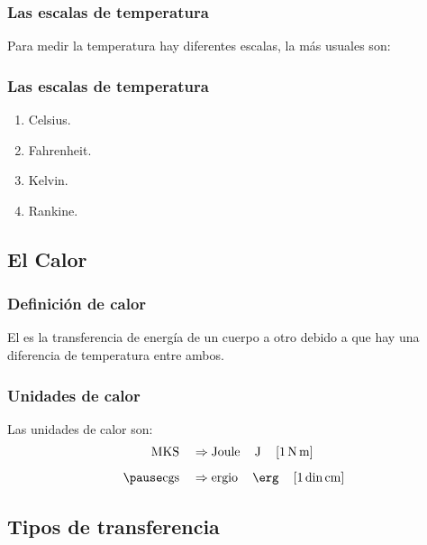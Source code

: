 \documentclass[14pt]{beamer}
\begin{document}
\begin{frame}
\frametitle{Las escalas de temperatura}
Para medir la temperatura hay diferentes escalas, la más usuales son:
\end{frame}
\begin{frame}
\frametitle{Las escalas de temperatura}
\begin{enumerate}[<+->]
\item Celsius.
\item Fahrenheit.
\item Kelvin.
\item Rankine.
\end{enumerate}
\end{frame}

\subsection{El Calor}

\begin{frame}
\frametitle{Definición de calor}
El  es la transferencia de energía de un cuerpo a otro debido a que hay una
diferencia de temperatura entre ambos.
\end{frame}
\begin{frame}
\frametitle{Unidades de calor}
Las unidades de calor son:
\pause
\begin{eqnarray*}
\begin{aligned}
\text{MKS} \quad &\Rightarrow \text{Joule} \, \quad \unit{\joule}  \quad \left[ \SI{1}{\newton\metre} \right] \\[0.5em] \pause
\text{cgs} \quad &\Rightarrow \text{ergio} \, \quad \unit{\erg} \quad \left[ 1 \, \text{din} \, \unit{\centi\metre} \right]
\end{aligned}
\end{eqnarray*}
\end{frame}

\subsection{Tipos de transferencia}
\end{document}
